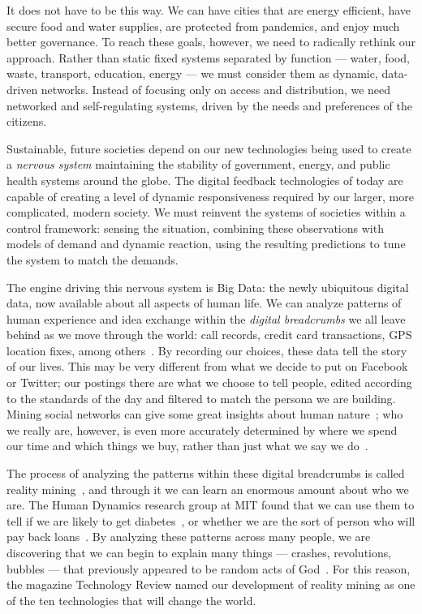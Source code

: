 It does not have to be this way.
We can have cities that are energy efficient, have secure food and water supplies, are protected from pandemics, and enjoy much better governance.
To reach these goals, however, we need to radically rethink our approach.
Rather than static fixed systems separated by function --- water, food, waste, transport, education, energy --- we must consider them as dynamic, data-driven networks.
Instead of focusing only on access and distribution, we need networked and self-regulating systems, driven by the needs and preferences of the citizens.

Sustainable, future societies depend on our new technologies being used to create a \emph{nervous system} maintaining the stability of government, energy, and public health systems around the globe.
The digital feedback technologies of today are capable of creating a level of dynamic responsiveness required by our larger, more complicated, modern society.
We must reinvent the systems of societies within a control framework: sensing the situation, combining these observations with models of demand and dynamic reaction, using the resulting predictions to tune the system to match the demands.

The engine driving this nervous system is Big Data: the newly ubiquitous digital data, now available about all aspects of human life.
We can analyze patterns of human experience and idea exchange within the \emph{digital breadcrumbs} we all leave behind as we move through the world: call records, credit card transactions, GPS location fixes, among others~\cite{lazer2009life}.
By recording our choices, these data tell the story of our lives.
This may be very different from what we decide to put on Facebook or Twitter; our postings there are what we choose to tell people, edited according to the standards of the day and filtered to match the persona we are building.
Mining social networks can give some great insights about human nature~\cite{aral2012identifying,mislove2010pulse, vitak2011s}; who we really are, however, is even more accurately determined by where we spend our time and which things we buy, rather than just what we say we do~\cite{madrigal2013dark}.

The process of analyzing the patterns within these digital breadcrumbs is called reality mining~\cite{eagle2006reality,pentland2009reality}, and through it we can learn an enormous amount about who we are.
The Human Dynamics research group at MIT found that we can use them to tell if we are likely to get diabetes~\cite{pentland2009using}, or whether we are the sort of person who will pay back loans~\cite{singh2013classifying}.
By analyzing these patterns across many people, we are discovering that we can begin to explain many things --- crashes, revolutions, bubbles --- that previously appeared to be random acts of God~\cite{pan2012decoding}.
For this reason, the magazine Technology Review named our development of reality mining as one of the ten technologies that will change the world\cite{greene2008reality}. 

